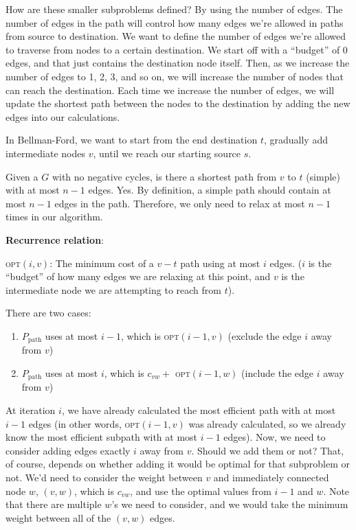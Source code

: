 \documentclass{article}
\newcommand{\OPT}{\textsc{opt}}
\begin{document}
How are these smaller subproblems defined? By using the number of edges. The number of edges in the path will control how many edges we're allowed in paths from source to destination. We want to define the number of edges we're allowed to traverse from nodes to a certain destination. We start off with a ``budget'' of 0 edges, and that just contains the destination node itself. Then, as we increase the number of edges to 1, 2, 3, and so on, we will increase the number of nodes that can reach the destination. Each time we increase the number of edges, we will update the shortest path between the nodes to the destination by adding the new edges into our calculations.

In Bellman-Ford, we want to start from the end destination $t$, gradually add intermediate nodes $v$, until we reach our starting source $s$.

Given a $G$ with no negative cycles, is there a shortest path from $v$ to $t$ (simple) with at most $n-1$ edges. Yes. By definition, a simple path should contain at most $n - 1$ edges in the path. Therefore, we only need to relax at most $n-1$ times in our algorithm.

\textbf{Recurrence relation}:

\OPT$(i, v)$: The minimum cost of a $v-t$ path using at most $i$ edges. ($i$ is the ``budget'' of how many edges we are relaxing at this point, and $v$ is the intermediate node we are attempting to reach from $t$).

There are two cases:
\begin{enumerate}
    \item $P_{\text{path}}$ uses at most $i - 1$, which is \OPT$(i - 1, v)$ (exclude the edge $i$ away from $v$)
    \item $P_{\text{path}}$ uses at most $i$, which is $c_{vw} +$ \OPT$(i-1, w)$ (include the edge $i$ away from $v$)
\end{enumerate}

At iteration $i$, we have already calculated the most efficient path with at most $i-1$ edges (in other words, \OPT$(i-1, v)$ was already calculated, so we already know the most efficient subpath with at most $i-1$ edges). Now, we need to consider adding edges exactly $i$ away from $v$. Should we add them or not? That, of course, depends on whether adding it would be optimal for that subproblem or not. We'd need to consider the weight between $v$ and immediately connected node $w$, $(v, w)$, which is $c_{vw}$, and use the optimal values from $i-1$ and $w$. Note that there are multiple $w$'s we need to consider, and we would take the minimum weight between all of the $(v, w)$ edges.
\end{document}
